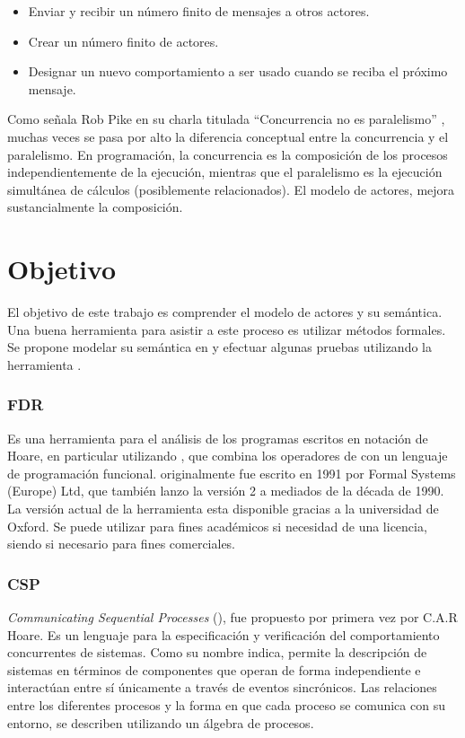\begin{itemize}
\item Enviar y recibir un número finito de mensajes a otros actores.
\item Crear un número finito de actores.
\item Designar un nuevo comportamiento a ser usado cuando se reciba el próximo mensaje.
\end{itemize}

Como señala Rob Pike en su charla titulada ``Concurrencia no es paralelismo'' \cite{rpike13:cnp}, muchas veces se pasa por alto la diferencia conceptual entre la concurrencia y el paralelismo. En programación, la concurrencia es la composición de los procesos independientemente de la ejecución, mientras que el paralelismo es la ejecución simultánea de cálculos (posiblemente relacionados). El modelo de actores, mejora sustancialmente la composición.

\section{Objetivo}
El objetivo de este trabajo es comprender el modelo de actores y su semántica. Una buena herramienta para asistir a este proceso es utilizar métodos formales. Se propone modelar su semántica en \CSP y efectuar algunas pruebas utilizando la herramienta \FDR\cite{fdr}.

\subsubsection*{FDR}

Es una herramienta para el análisis de los programas escritos en notación \CSP de Hoare, en particular utilizando \CSPm, que combina los operadores de \CSP con un lenguaje de programación funcional. \FDR originalmente fue escrito en 1991 por Formal Systems (Europe) Ltd, que también lanzo la versión 2 a mediados de la década de 1990. La versión actual de la herramienta esta disponible gracias a la universidad de Oxford. Se puede utilizar para fines académicos si necesidad de una licencia, siendo si necesario para fines comerciales.

\subsubsection*{CSP}

\textit{Communicating Sequential Processes} (\CSP), fue propuesto por primera vez por C.A.R Hoare\cite{Hoare:1978:CSP:359576.359585}. Es un lenguaje para la especificación y verificación del comportamiento concurrentes de sistemas. Como su nombre indica, \CSP permite la descripción de sistemas en términos de componentes que operan de forma independiente e interactúan entre sí únicamente a través de eventos sincrónicos. Las relaciones entre los diferentes procesos y la forma en que cada proceso se comunica con su entorno, se describen utilizando un álgebra de procesos.

